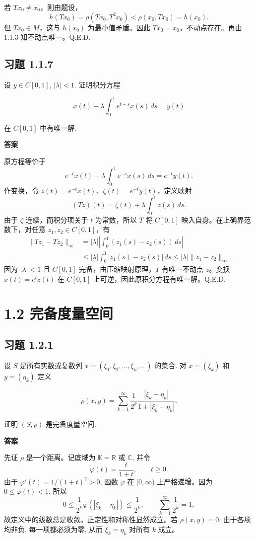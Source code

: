 \documentclass[UTF8,a4paper,11pt,fontset=fandol]{ctexart}
\newcommand{\exercise}[1]{\par\ifdim\dimexpr\pagegoal-\pagetotal\relax<7\baselineskip\newpage\fi\subsection*{习题 #1}}
\newcommand{\answer}{\par\smallskip\noindent\textbf{答案}\quad}
\newcommand{\qedherecustom}{\unskip\hfill\mbox{\normalfont Q.E.D.}\par}
\begin{document}
若 $Tx_0\ne x_0$，则由题设，
\[
h(Tx_0)=\rho(Tx_0,T^2x_0)<\rho(x_0,Tx_0)=h(x_0).
\]
但 $Tx_0\in M$，这与 $h(x_0)$ 为最小值矛盾。因此 $Tx_0=x_0$，不动点存在。再由 1.1.3 知不动点唯一。\qedherecustom

\exercise{1.1.7}

设 $y\in C[0,1]$, $|\lambda|<1$. 证明积分方程

\[
x(t)-\lambda\int_0^1e^{t-s}x(s)\,ds=y(t)
\]

在 $C[0,1]$ 中有唯一解.

\answer

原方程等价于
\[
e^{-t}x(t)-\lambda\int_0^1e^{-s}x(s)\,ds=e^{-t}y(t).
\]
作变换，令 $z(t)=e^{-t}x(t)$、$\zeta(t)=e^{-t}y(t)$，定义映射
\[
(Tz)(t)=\zeta(t)+\lambda\int_0^1z(s)\,ds.
\]
由于 $\zeta$ 连续，而积分项关于 $t$ 为常数，所以 $T$ 将 $C[0,1]$ 映入自身。在上确界范数下，对任意 $z_1,z_2\in C[0,1]$，有
\[
\begin{aligned}
\|Tz_1-Tz_2\|_\infty
&=|\lambda|\left|\int_0^1(z_1(s)-z_2(s))\,ds\right|\\
&\leq|\lambda|\int_0^1|z_1(s)-z_2(s)|\,ds
\leq|\lambda|\|z_1-z_2\|_\infty.
\end{aligned}
\]
因为 $|\lambda|<1$ 且 $C[0,1]$ 完备，由压缩映射原理，$T$ 有唯一不动点 $z$。变换 $x(t)=e^tz(t)$ 在 $C[0,1]$ 上可逆，因此原积分方程有唯一解。\qedherecustom

\section*{1.2 完备度量空间}

\exercise{1.2.1}

设 $S$ 是所有实数或复数列 $x=(\xi_1,\xi_2,\ldots,\xi_n,\ldots)$ 的集合. 对 $x=(\xi_k)$ 和 $y=(\eta_k)$ 定义

\[
\rho(x,y)=\sum_{k=1}^{\infty}\frac{1}{2^k}\frac{|\xi_k-\eta_k|}{1+|\xi_k-\eta_k|}.
\]

证明 $(S,\rho)$ 是完备度量空间.

\answer

先证 $\rho$ 是一个距离。记底域为 $\mathbb K=\mathbb R$ 或 $\mathbb C$, 并令
\[
\varphi(t)=\frac{t}{1+t},\qquad t\geq0.
\]
由于 $\varphi'(t)=1/(1+t)^2>0$, 函数 $\varphi$ 在 $[0,\infty)$ 上严格递增。因为 $0\leq\varphi(t)<1$, 所以
\[
0\leq\frac1{2^k}\varphi\left(|\xi_k-\eta_k|\right)\leq\frac1{2^k},
\qquad
\sum_{k=1}^{\infty}\frac1{2^k}=1,
\]
故定义中的级数总是收敛。正定性和对称性显然成立。若 $\rho(x,y)=0$, 由于各项均非负, 每一项都必须为零, 从而 $\xi_k=\eta_k$ 对所有 $k$ 成立。
\end{document}
